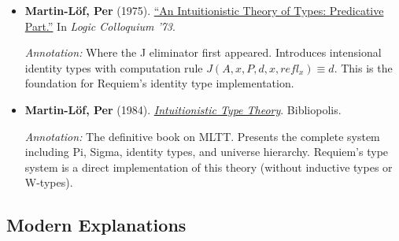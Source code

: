 \documentclass[11pt]{article}
\begin{document}
\begin{itemize}[leftmargin=*]
\item \textbf{Martin-Löf, Per} (1975). \href{https://archive-pml.github.io/martin-lof/pdfs/An-Intuitionistic-Theory-of-Types-Predicative-Part-1975.pdf}{``An Intuitionistic Theory of Types: Predicative Part.''} In \emph{Logic Colloquium '73}.

\textit{Annotation:} Where the J eliminator first appeared. Introduces intensional identity types with computation rule $J(A, x, P, d, x, refl_x) \equiv d$. This is the foundation for Requiem's identity type implementation.

\item \textbf{Martin-Löf, Per} (1984). \href{https://archive-pml.github.io/martin-lof/pdfs/Bibliopolis-Book-retypeset-1984.pdf}{\emph{Intuitionistic Type Theory}}. Bibliopolis.

\textit{Annotation:} The definitive book on MLTT. Presents the complete system including Pi, Sigma, identity types, and universe hierarchy. Requiem's type system is a direct implementation of this theory (without inductive types or W-types).

\end{itemize}

\subsection{Modern Explanations}
\end{document}
